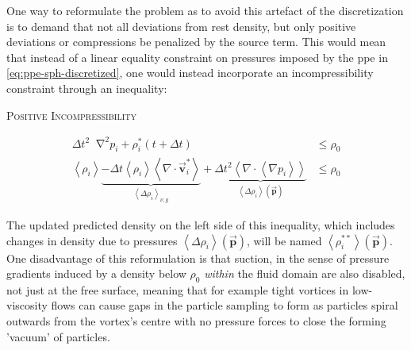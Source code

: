 \documentclass[conference]{IEEEtran}
\newcommand*\Laplace{\mathop{}\!\mathbin\nabla^2}
\newcommand\vek[1]{\vec{\bm{#1}}}
\newcommand\br[1]{\left(#1\right)}
\newcommand\abr[1]{\left\langle#1\right\rangle}
\newcommand\divergence{{\nabla\cdot}}
\newcommand{\equationnamed}[2]{%
  \setlength{\fboxsep}{2pt} %
  \setlength{\fboxrule}{0.01pt}
  \begin{center}
    \begin{minipage}{\linewidth}
      \begin{center}\textsc{#1}\end{center}
      #2
    \end{minipage}
  \end{center}
}
\begin{document}
One way to reformulate the problem as to avoid this artefact of the discretization is to demand that not all deviations from rest density, but only positive deviations or compressions be penalized by the source term. This would mean that instead of a linear equality constraint on pressures imposed by the \ac{ppe} in \autoref{eq:ppe-sph-discretized}, one would instead incorporate an incompressibility constraint through an inequality:
\equationnamed{Positive Incompressibility}{
  \begin{align}
    \Delta t^2 \Laplace p_i + \rho_i^*(t+\Delta t) &\leq \rho_0 \\
      \abr{\rho_i} \underbrace{ - \Delta t \abr{\rho_i}\abr{\divergence \vek{v}^*_i}}_{\abr{\Delta \rho_i}_{\nu,g}}  + \underbrace{\Delta t^2 \abr{\divergence \abr{\nabla p_i}}}_{\abr{\Delta \rho_i}\br{\vek{p}}}
    &\leq \rho_0\label{eq:incompressibility-positive}
  \end{align}
}

The updated predicted density on the left side of this inequality, which includes changes in density due to pressures $\abr{\Delta \rho_i}\br{\vek{p}}$, will be named $\abr{\rho_i^{**}}(\vek{p})$. One disadvantage of this reformulation is that suction, in the sense of pressure gradients induced by a density below $\rho_0$ \textit{within} the fluid domain are also disabled, not just at the free surface, meaning that for example tight vortices in low-viscosity flows can cause gaps in the particle sampling to form as particles spiral outwards from the vortex's centre with no pressure forces to close the forming 'vacuum' of particles. 
\end{document}

